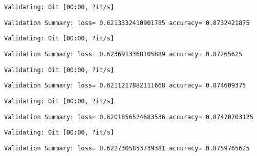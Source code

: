 \documentclass[11pt]{article}
\begin{document}
    
    \begin{Verbatim}[commandchars=\\\{\}]
Validating: 0it [00:00, ?it/s]
    \end{Verbatim}

    
    \begin{Verbatim}[commandchars=\\\{\}]
Validation Summary: loss= 0.6213332410901785 accuracy= 0.8732421875
    \end{Verbatim}

    
    \begin{Verbatim}[commandchars=\\\{\}]
Validating: 0it [00:00, ?it/s]
    \end{Verbatim}

    
    \begin{Verbatim}[commandchars=\\\{\}]
Validation Summary: loss= 0.6236913368105889 accuracy= 0.87265625
    \end{Verbatim}

    
    \begin{Verbatim}[commandchars=\\\{\}]
Validating: 0it [00:00, ?it/s]
    \end{Verbatim}

    
    \begin{Verbatim}[commandchars=\\\{\}]
Validation Summary: loss= 0.6211217882111668 accuracy= 0.874609375
    \end{Verbatim}

    
    \begin{Verbatim}[commandchars=\\\{\}]
Validating: 0it [00:00, ?it/s]
    \end{Verbatim}

    
    \begin{Verbatim}[commandchars=\\\{\}]
Validation Summary: loss= 0.6201856524683536 accuracy= 0.87470703125
    \end{Verbatim}

    
    \begin{Verbatim}[commandchars=\\\{\}]
Validating: 0it [00:00, ?it/s]
    \end{Verbatim}

    
    \begin{Verbatim}[commandchars=\\\{\}]
Validation Summary: loss= 0.6227305853739381 accuracy= 0.8759765625
    \end{Verbatim}
\end{document}

